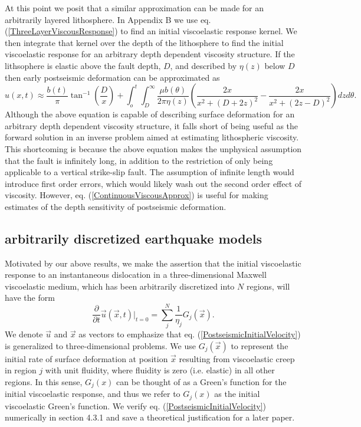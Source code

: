 \documentclass[extra,mreferee]{gji}
\begin{document}
At this point we posit that a similar approximation can be made for an
arbitrarily layered lithosphere. In Appendix B we use
eq. (\ref{ThreeLayerViscousResponse}) to find an initial viscoelastic
response kernel.  We then integrate that kernel over the depth of the
lithosphere to find the initial viscoelastic response for an arbitrary
depth dependent viscosity structure.  If the lithsophere is elastic
above the fault depth, $D$, and described by $\eta(z)$ below $D$ then
early postseismic deformation can be approximated as
\begin{equation}\label{ContinuousViscousApprox}
u(x,t) \approx \frac{b(t)}{\pi}\tan^{-1}(\frac{D}{x}) + 
               \int_o^t\int_D^\infty \frac{\mu b(\theta)}{2\pi\eta(z)}
                                    \left(\frac{2x}{x^2 + \left(D + 2z\right)^2} - 
                                    \frac{2x}{x^2 + \left(2z - D\right)^2}\right)
                                    dz d\theta.
\end{equation}
Although the above equation is capable of describing surface
deformation for an arbitrary depth dependent viscosity structure, it
falls short of being useful as the forward solution in an inverse
problem aimed at estimating lithospheric viscosity.  This shortcoming
is because the above equation makes the unphysical assumption that the
fault is infinitely long, in addition to the restriction of only being
applicable to a vertical strike-slip fault.  The assumption of
infinite length would introduce first order errors, which would likely
wash out the second order effect of viscosity. However,
eq. (\ref{ContinuousViscousApprox}) is useful for making estimates of
the depth sensitivity of postseismic deformation.

\subsection{arbitrarily discretized earthquake models}
Motivated by our above results, we make the assertion that the initial
viscoelastic response to an instantaneous dislocation in a
three-dimensional Maxwell viscoelastic medium, which has been
arbitrarily discretized into $N$ regions, will have the form
\begin{equation}\label{PostseismicInitialVelocity}
  \frac{\partial}{\partial t}\vec{u}(\vec{x},t)\big|_{t=0} = \sum_j^N\frac{1}{\eta_j}G_j(\vec{x}).
\end{equation}
We denote $\vec{u}$ and $\vec{x}$ as vectors to emphasize that
eq. (\ref{PostseismicInitialVelocity}) is generalized to
three-dimensional problems.  We use $G_j(\vec{x})$ to represent the
initial rate of surface deformation at position $\vec{x}$ resulting
from viscoelastic creep in region $j$ with unit fluidity, where
fluidity is zero (i.e. elastic) in all other regions.  In this sense,
$G_j(x)$ can be thought of as a Green's function for the initial
viscoelastic response, and thus we refer to $G_j(x)$ as the initial
viscoelastic Green's function.  We verify
eq. (\ref{PostseismicInitialVelocity}) numerically in section 4.3.1 and
save a theoretical justification for a later paper.
\end{document}
